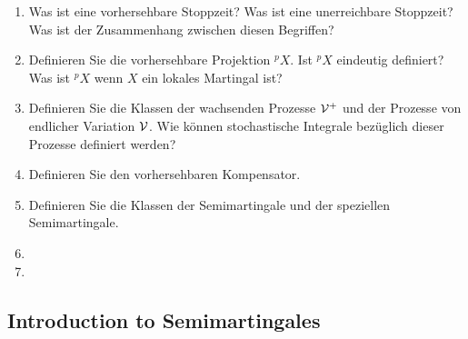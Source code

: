 \documentclass[11pt,oneside]{amsart}
\newcommand{\pp}[1]{\phantom{}^{p}#1}
\begin{document}
\begin{enumerate}
    \item Was ist eine vorhersehbare Stoppzeit? Was ist eine unerreichbare Stoppzeit? 
        Was ist der Zusammenhang zwischen diesen Begriffen? 

    \item Definieren Sie die vorhersehbare Projektion $\pp{X}$. Ist $\pp{X}$ eindeutig
        definiert? Was ist $\pp{X}$ wenn $X$ ein lokales Martingal ist?

    \item Definieren Sie die Klassen der wachsenden Prozesse $\mathcal V^{+}$ und der
        Prozesse von endlicher Variation $\mathcal V$. Wie können stochastische Integrale
        bezüglich dieser Prozesse definiert werden?
    \item Definieren Sie den vorhersehbaren Kompensator.
    \item Definieren Sie die Klassen der Semimartingale und der speziellen Semimartingale. 
    \item 
    \item 

\end{enumerate}



\subsection{Introduction to Semimartingales}
\end{document}

